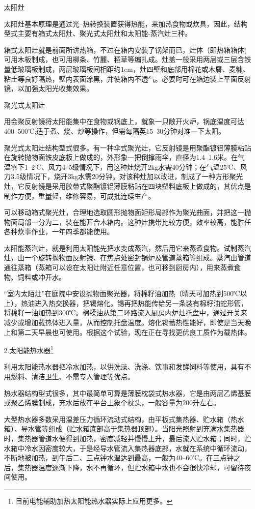 \documentclass{ctexbook}
\begin{document}
太阳灶

太阳灶基本原理是通过光--热转换装置获得热能，来加热食物或炊具，因此，结构型式主要有箱式太阳灶、聚光式太阳灶和太阳能-蒸汽灶三种。

箱式太阳灶就是前面所讲热箱，不过在箱内安装了锅架而已，灶体（即热箱箱体)可用木板制成，也可用柳条、竹麓、稻草等编扎成。灶盖一般采用两层或三层含铁量低玻璃板制成，两层玻璃板间相距约1cm，灶四壁和底部用棉花或木屑、麦糠、粘土等良好隔热，壁内表面涂黑，并使箱内不透气。必要时可在箱边装上平面反射镜，以加强太阳光收集效果。

聚光式太阳灶

用会聚反射镜将太阳能集中在食物或锅底上，就象一只敞开火炉，锅底温度可达400~500℃;适于煮、烧、炒等操作，但需每隔英15--30分钟对准一下太阳。

聚光式太阳灶结构型式很多。有一种伞式聚光灶，它反射镜是用聚酯镀铝薄膜粘贴在旋转抛物面铁皮底板上做成的，外形象一把倒撑雨伞，直径为1.4--1.6米。在气温零下1--2℃、风力4--5级情况下，用这种灶烧开2kg水需40分钟；在气温25℃、风力3.5级情况下，烧开3kg水需20分钟。对该种灶加以改进，制成了一种方形聚光灶，它反射镜是采用胶带式聚酯镀铝薄膜粘贴在四块塑料底板上做成的，其优点是制作方便，重量轻，维修容易，可成批连续生产。

可以移动箱式聚光灶，合理地选取圆形抛物面矩形局部作为聚光曲面，并把这一抛物面局部一分为二，装在能开合木箱内。这种灶携带比较方便，效率较高，能胜任各种炊事作业，一年四季都能使用。

太阳能蒸汽灶，就是利用太阳能先把水变成蒸汽，然后用它来蒸煮食物。试制蒸汽灶，由一个旋转抛物面反射镜、在焦点处密封锅炉及管道蒸箱等组成。蒸汽由管道通往蒸箱（蒸箱可以设在太阳灶附近任意位置，也可移到厨房内），用来蒸煮食物、饲料或冲开水。


“室内太陌灶”在庭院中安设抛物面聚光器，将棉籽油加热（晴天可加热到500℃以上），热油进入热交换器，把锡熔化。锡再把热能传给另一条装有棉籽油蛇形管，将棉籽一油加热到300℃。棉糅油从第二环路流入厨房内炉灶托盘中，通过开关来减少或增加载热体进入量，从而控制托盘温度。熔化锡蓄热性能好，即使是当天晚上和第二天早晨也可使用。根据这个试验，现在正在寻找更优良工质作为载热体。

2.太阳能热水器\footnote{目前电能辅助加热太阳能热水器实际上应用更多。}

利用太阳能热水器把冷水加热，以供洗澡、洗涤、饮事和发酵饲料等使用，具有不用燃料、清洁卫生、不需专人管理等优点。

热水器结构型式很多，其中最简单可算是薄膜枕袋式热水器，它是由两层乙烯基膜或聚乙烯膜制成，充水后放在平台上象个枕头，一般容量为200升左右。

大型热水器多数采用温差压力循环流动式结构，由平板式集热器、贮水箱（热水箱）、导水管等组成（贮水箱底部高于集热器顶部）。当阳光照射到充满水集热器时，集热器管道水便得到加热，密度减轻并慢慢上升，最后流入贮水箱；同时，贮水箱中冷水因密度较大，于是经导水管流入集热器底部，水就在系统中循环流动，不断地被加热，到午后二、三点钟水温达到最高，一般为40--60℃。在三点钟之后，集热器温度逐渐下降，水不再循环，但贮水箱中水也不会很快冷却，可留待夜间使用。
\end{document}
